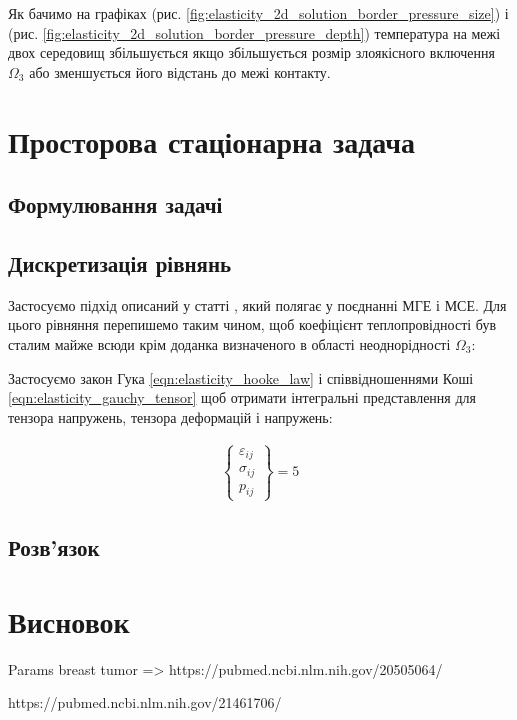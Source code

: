 Як бачимо на графіках (рис. \ref{fig:elasticity_2d_solution_border_pressure_size}) і (рис.
\ref{fig:elasticity_2d_solution_border_pressure_depth}) температура на межі двох середовищ збільшується якщо
збільшується розмір злоякісного включення $\Omega_3$ або зменшується його відстань до межі контакту.

\section{Просторова стаціонарна задача}

\subsection{Формулювання задачі}

\subsection{Дискретизація рівнянь}

Застосуємо підхід описаний у статті \cite{personal-bem-elasticity}, який полягає у поєднанні МГЕ і МСЕ. Для цього
рівняння перепишемо таким чином, щоб коефіцієнт теплопровідності був сталим майже всюди крім доданка визначеного в
області неоднорідності $\Omega_3$: 

Застосуємо закон Гука \ref{eqn:elasticity_hooke_law} і співвідношеннями Коші \ref{eqn:elasticity_gauchy_tensor} щоб 
отримати інтегральні представлення для тензора напружень, тензора деформацій і напружень:


\begin{equation}
    \label{eqn:elasticity_3d_cobem_direct_elasticity_components}
    \begin{split}
        \left\{ \begin{array}{lr} \varepsilon_{ij} \\ \sigma_{ij} \\ p_{ij} \end{array} \right \} = 5
    \end{split}
\end{equation}

\subsection{Розв'язок}

\section{Висновок}


Params breast tumor => https://pubmed.ncbi.nlm.nih.gov/20505064/


https://pubmed.ncbi.nlm.nih.gov/21461706/ 

